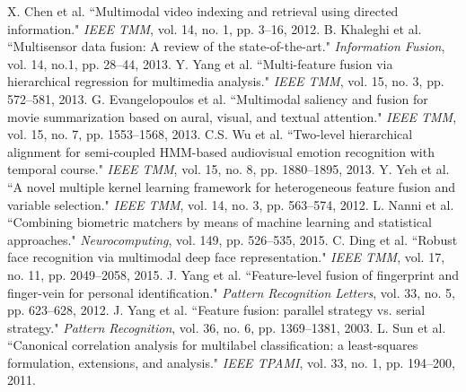 \documentclass[journal]{IEEEtran}
\begin{document}
%
%
%
\begin{thebibliography}{1}
X. Chen et al. ``Multimodal video indexing and retrieval using directed information." \emph{IEEE TMM}, vol. 14, no. 1, pp. 3--16, 2012.
B. Khaleghi et al. ``Multisensor data fusion: A review of the state-of-the-art." \emph{Information Fusion}, vol. 14, no.1, pp. 28--44, 2013.
Y. Yang et al. ``Multi-feature fusion via hierarchical regression for multimedia analysis." \emph{IEEE TMM}, vol. 15, no. 3, pp. 572--581, 2013.
G. Evangelopoulos et al. ``Multimodal saliency and fusion for movie summarization based on aural, visual, and textual attention." \emph{IEEE TMM}, vol. 15, no. 7, pp. 1553--1568, 2013.
C.S. Wu et al. ``Two-level hierarchical alignment for semi-coupled HMM-based audiovisual emotion recognition with temporal course." \emph{IEEE TMM}, vol. 15, no. 8, pp. 1880--1895, 2013.
Y. Yeh et al. ``A novel multiple kernel learning framework for heterogeneous feature fusion and variable selection." \emph{IEEE TMM}, vol. 14, no. 3, pp. 563--574, 2012.
L. Nanni et al. ``Combining biometric matchers by means of machine learning and statistical approaches." \emph{Neurocomputing}, vol. 149, pp. 526--535, 2015.
C. Ding et al. ``Robust face recognition via multimodal deep face representation." \emph{IEEE TMM}, vol. 17, no. 11, pp. 2049--2058, 2015.
J. Yang et al. ``Feature-level fusion of fingerprint and finger-vein for personal identification." \emph{Pattern Recognition Letters}, vol. 33, no. 5, pp. 623--628, 2012.
J. Yang et al. ``Feature fusion: parallel strategy vs. serial strategy."  \emph{Pattern Recognition}, vol. 36, no. 6, pp. 1369--1381, 2003.
L. Sun et al. ``Canonical correlation analysis for multilabel classification: a least-squares formulation, extensions, and analysis." \emph{IEEE TPAMI}, vol. 33, no. 1, pp. 194--200, 2011.

\end{thebibliography}
\end{document}
